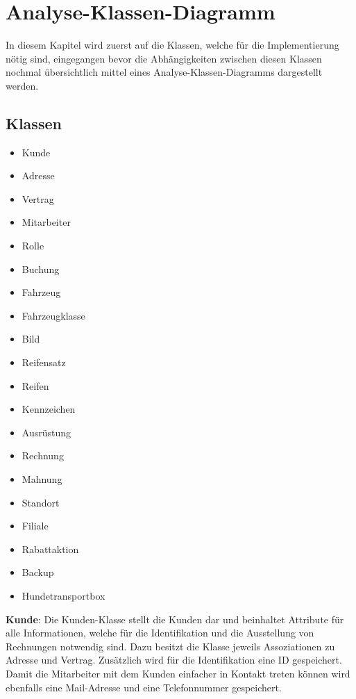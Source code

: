\chapter{Analyse-Klassen-Diagramm}

In diesem Kapitel wird zuerst auf die Klassen, welche für die Implementierung nötig sind, eingegangen bevor die Abhängigkeiten zwischen diesen Klassen nochmal übersichtlich mittel eines Analyse-Klassen-Diagramms dargestellt werden.

\section{Klassen}
\begin{multicols}{2}
\begin{itemize}
    \item Kunde
    \item Adresse
    \item Vertrag
    \item Mitarbeiter
    \item Rolle
    \item Buchung
    \item Fahrzeug
    \item Fahrzeugklasse
    \item Bild
    \item Reifensatz
    \item Reifen
    \item Kennzeichen
    \item Ausrüstung
    \item Rechnung
    \item Mahnung
    \item Standort
    \item Filiale
    \item Rabattaktion
    \item Backup
    \item Hundetransportbox
\end{itemize}
\end{multicols}

\textbf{Kunde}: Die Kunden-Klasse stellt die Kunden dar und beinhaltet Attribute für alle Informationen, welche für die Identifikation und die Ausstellung von Rechnungen notwendig sind. Dazu besitzt die Klasse jeweils Assoziationen zu Adresse und Vertrag. Zusätzlich wird für die Identifikation eine ID gespeichert. Damit die Mitarbeiter mit dem Kunden einfacher in Kontakt treten können wird ebenfalls eine Mail-Adresse und eine Telefonnummer gespeichert. 

